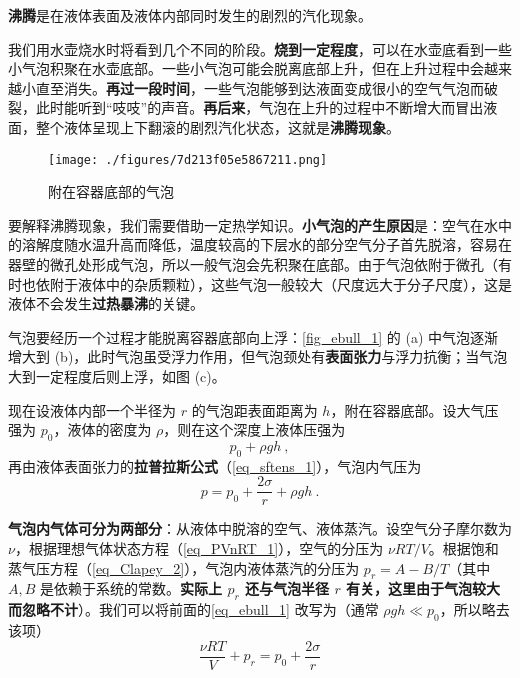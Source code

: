 
\textbf{沸腾}是在液体表面及液体内部同时发生的剧烈的汽化现象。

我们用水壶烧水时将看到几个不同的阶段。\textbf{烧到一定程度}，可以在水壶底看到一些小气泡积聚在水壶底部。一些小气泡可能会脱离底部上升，但在上升过程中会越来越小直至消失。\textbf{再过一段时间}，一些气泡能够到达液面变成很小的空气气泡而破裂，此时能听到“吱吱”的声音。\textbf{再后来}，气泡在上升的过程中不断增大而冒出液面，整个液体呈现上下翻滚的剧烈汽化状态，这就是\textbf{沸腾现象}。
\begin{figure}[ht]
\centering
\texttt{[image: ./figures/7d213f05e5867211.png]}
\caption{附在容器底部的气泡} \label{fig_ebull_1}
\end{figure}
要解释沸腾现象，我们需要借助一定热学知识。\textbf{小气泡的产生原因}是：空气在水中的溶解度随水温升高而降低，温度较高的下层水的部分空气分子首先脱溶，容易在器壁的微孔处形成气泡，所以一般气泡会先积聚在底部。由于气泡依附于微孔（有时也依附于液体中的杂质颗粒），这些气泡一般较大（尺度远大于分子尺度），这是液体不会发生\textbf{过热暴沸}的关键。

气泡要经历一个过程才能脱离容器底部向上浮：\autoref{fig_ebull_1} 的 (a) 中气泡逐渐增大到 (b)，此时气泡虽受浮力作用，但气泡颈处有\textbf{表面张力}与浮力抗衡；当气泡大到一定程度后则上浮，如图 (c)。

现在设液体内部一个半径为 $r$ 的气泡距表面距离为 $h$，附在容器底部。设大气压强为 $p_0$，液体的密度为 $\rho$，则在这个深度上液体压强为
\begin{equation}
p_0+\rho gh ~,
\end{equation}
再由液体表面张力的\textbf{拉普拉斯公式}（\autoref{eq_sftens_1}），气泡内气压为
\begin{equation}\label{eq_ebull_1}
p=p_0+\frac{2\sigma}{r}+\rho gh~.
\end{equation}

\textbf{气泡内气体可分为两部分}：从液体中脱溶的空气、液体蒸汽。设空气分子摩尔数为 $\nu$，根据理想气体状态方程（\autoref{eq_PVnRT_1}），空气的分压为 $\nu RT/V$。根据饱和蒸气压方程（\autoref{eq_Clapey_2}），气泡内液体蒸汽的分压为 $p_r=A-B/T$（其中 $A,B$ 是依赖于系统的常数。\textbf{实际上 $p_r$ 还与气泡半径 $r$ 有关，这里由于气泡较大而忽略不计}）。我们可以将前面的\autoref{eq_ebull_1} 改写为（通常 $\rho gh\ll p_0$，所以略去该项）
\begin{equation}\label{eq_ebull_2}
\frac{\nu RT}{V}+p_r=p_0+\frac{2\sigma}{r}
\end{equation}

